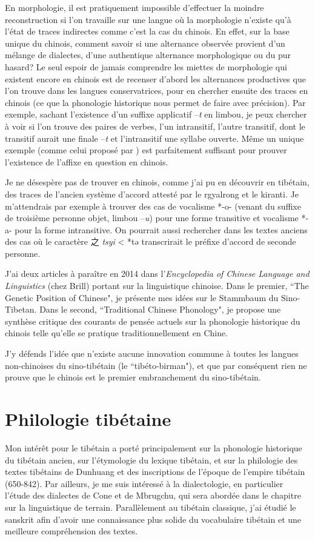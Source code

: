 \documentclass[oldfontcommands,oneside,a4paper,11pt]{memoir}
\newcommand{\zh}[1]{{\cn #1}}
\begin{document}
En morphologie, il est pratiquement impossible d'effectuer la moindre reconstruction si l'on travaille sur une langue où la morphologie n'existe qu'à l'état de traces indirectes comme c'est la cas du chinois. En effet, sur la base unique du chinois, comment savoir si une alternance observée provient d'un mélange de dialectes, d'une authentique alternance morphologique ou du pur hasard? Le seul espoir de jamais comprendre les miettes de morphologie qui existent encore en chinois est de recenser d'abord les alternances productives que l'on trouve dans les langues  conservatrices, pour  en chercher ensuite des traces en chinois (ce que la phonologie historique nous permet de faire avec précision). Par exemple, sachant l'existence d'un suffixe applicatif --\textit{t} en limbou, je peux chercher à voir si l'on trouve des paires de verbes, l'un intransitif, l'autre transitif, dont le transitif aurait une finale --\textit{t} et l'intransitif une syllabe ouverte. Même un unique exemple (comme celui proposé par \citet{sagart04directions}) est parfaitement suffisant pour prouver l'existence de l'affixe en question en chinois. 

Je ne désespère pas de trouver en chinois, comme j'ai pu en découvrir en tibétain, des traces de l'ancien système d'accord attesté par le rgyalrong et le kiranti. Je m'attendrais par exemple à trouver des cas de vocalisme *-o- (venant du suffixe de troisième personne objet, limbou --\textit{u}) pour une forme transitive et vocalisme *-a- pour la forme intransitive. On pourrait aussi rechercher dans les textes anciens des cas où le caractère \zh{之} \textit{tsyi} < *tə transcrirait le préfixe d'accord de seconde personne.  


J'ai deux articles à paraître en 2014 dans l'\textit{Encyclopedia of Chinese Language and Linguistics} (chez Brill) portant sur la linguistique chinoise. Dans le premier, ``The Genetic Position of Chinese", je présente mes idées sur le Stammbaum du Sino-Tibetan. Dans le second, ``Traditional Chinese Phonology", je propose une synthèse critique des courants de pensée actuels sur la phonologie historique du chinois telle qu'elle se pratique traditionnellement en Chine.

J'y défends l'idée que n'existe aucune innovation commune à toutes les langues non-chinoises du sino-tibétain (le ``tibéto-birman"), et que par conséquent rien ne prouve que le chinois est le premier embranchement du sino-tibétain.

\section{Philologie tibétaine}
Mon intérêt pour le tibétain a porté principalement sur la phonologie historique du tibétain ancien, sur l’étymologie du lexique tibétain, et sur la philologie des textes tibétains de Dunhuang et des inscriptions de l’époque de l’empire tibétain (650-842). Par ailleurs, je me suis intéressé à la dialectologie, en particulier l'étude des dialectes de Cone et de Mbrugchu, qui sera   abordée dans le chapitre sur la linguistique de terrain. Parallèlement au tibétain classique, j'ai étudié le sanskrit afin d'avoir une connaissance plus solide du vocabulaire tibétain et une meilleure compréhension des textes.
\end{document}
